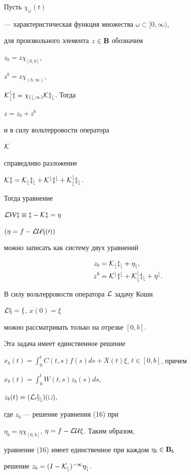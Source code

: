 \begin{pf} Пусть $\chi_\omega(t)$


--- характеристическая функция множества $\omega\subset[0,\infty)$,


для произвольного элемента $z\in\bold B$ обозначим


$z_b = z \chi_{[0,b]}$,


$z^b = z \chi_{(b,\infty)}$,


$\cal K^b_b z =\chi_{(b,\infty)}\cal K z_b$. Тогда


$z = z_b + z^b$


и в силу вольтерровости оператора


$\cal K$


справедливо разложение


$\cal K z = \cal K_b z_b + \cal K^b z^b +\cal K^b_b z_b$.


Тогда уравнение


$\cal L\cal W z \equiv z - \cal K z = \eta$


$(\eta = f-\cal L\cal Ux(0))$


можно записать как систему двух уравнений


\begin{align}


z_b &= \cal K_b z_b + \eta_b,\\


z^b &= \cal K^b z^b + \cal K^b_b z_b +\eta^b.


\end{align}


В силу вольтерровости оператора $\cal L$ задачу Коши


$\cal L x = f$, $x(0)=\xi$


можно рассматривать только на отрезке $[0,b].$


Эта задача имеет единственное решение


$x_b(t) = \int_0^t C(t,s)f(s)ds +X(t)\xi$, $t\in[0,b]$, причем


$x_b(t) = \int_0^t W(t,s) z_b(s)ds$,


$z_b(t) = (\cal L_0 x_b)(t),$


где $z_b$ --- решение уравнения (16) при


$\eta_b = \eta \chi_{[0,b]}$, $\eta = f - \cal L\cal U\xi$. Таким образом,


уравнение (16) имеет единственное при каждом $\eta_b\in\bold B_b$


решение $z_b = (I- \cal K_b)^{-1}\eta_b$.






\end{pf}
